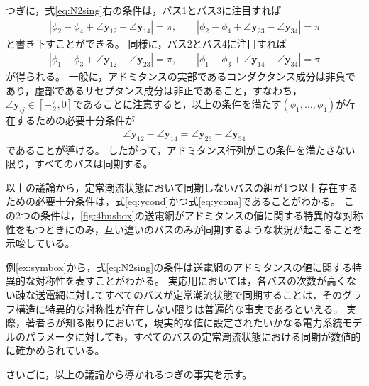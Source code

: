 \documentclass[tombow,dvipdfmx]{corona-a5}
\begin{document}
\begin{例}
つぎに，式\ref{eq:N2sing}右の条件は，バス1とバス3に注目すれば
\begin{align*}
|\phi_2 - \phi_4 + \angle \bm{y}_{12} - \angle \bm{y}_{14}|=\pi
,\qquad
|\phi_2 - \phi_4 + \angle \bm{y}_{23} - \angle \bm{y}_{34}|=\pi
\end{align*}
と書き下すことができる。
同様に，バス2とバス4に注目すれば
\begin{align*}
|\phi_1 - \phi_3 + \angle \bm{y}_{12} - \angle \bm{y}_{23}|=\pi
,\qquad
|\phi_1 - \phi_3 + \angle \bm{y}_{14} - \angle \bm{y}_{34}|=\pi
\end{align*}
が得られる。
一般に，アドミタンスの実部であるコンダクタンス成分は非負であり，虚部であるサセプタンス成分は非正であること，すなわち，$\angle \bm{y}_{ij} \in \left[-\frac{\pi}{2},0 \right]$であることに注意すると，以上の条件を満たす$(\phi_1,\ldots,\phi_4)$が存在するための必要十分条件が
\begin{align}\label{eq:ycona}
\angle \bm{y}_{12} - \angle \bm{y}_{14}=
\angle \bm{y}_{23} - \angle \bm{y}_{34}
\end{align}
であることが導ける。
したがって，アドミタンス行列がこの条件を満たさない限り，すべてのバスは同期する。

以上の議論から，定常潮流状態において同期しないバスの組が1つ以上存在するための必要十分条件は，式\ref{eq:ycond}かつ式\ref{eq:ycona}であることがわかる。
この2つの条件は，\ref{fig:4busbox}の送電網がアドミタンスの値に関する特異的な対称性をもつときにのみ，互い違いのバスのみが同期するような状況が起こることを示唆している。
\end{例}

例\ref{ex:symbox}から，式\ref{eq:N2sing}の条件は送電網のアドミタンスの値に関する特異的な対称性を表すことがわかる。
実応用においては，各バスの次数が高くない疎な送電網に対してすべてのバスが定常潮流状態で同期することは，そのグラフ構造に特異的な対称性が存在しない限りは普遍的な事実であるといえる。
実際，著者らが知る限りにおいて，現実的な値に設定されたいかなる電力系統モデルのパラメータに対しても，すべてのバスの定常潮流状態における同期が数値的に確かめられている。


さいごに，以上の議論から導かれるつぎの事実を示す。
\end{document}
